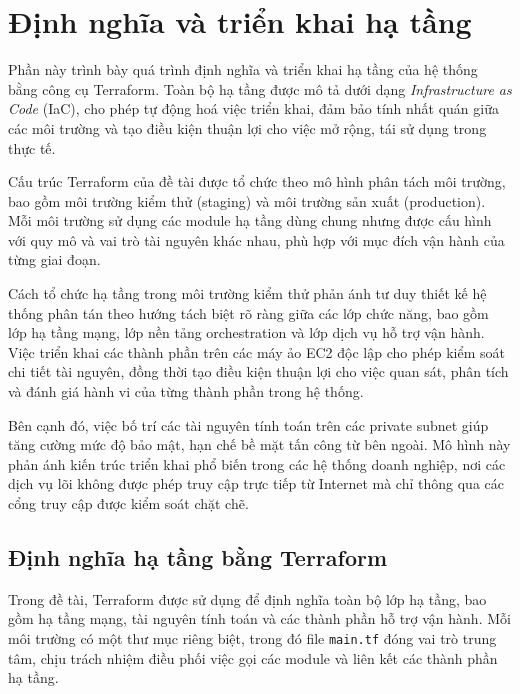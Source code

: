 \clearpage

\section{Định nghĩa và triển khai hạ tầng}
\label{sec:chap2-terraform}

Phần này trình bày quá trình định nghĩa và triển khai hạ tầng của hệ thống bằng công cụ Terraform. 
Toàn bộ hạ tầng được mô tả dưới dạng \textit{Infrastructure as Code} (IaC), cho phép tự động hoá 
việc triển khai, đảm bảo tính nhất quán giữa các môi trường và tạo điều kiện thuận lợi cho việc 
mở rộng, tái sử dụng trong thực tế.

Cấu trúc Terraform của đề tài được tổ chức theo mô hình phân tách môi trường, bao gồm môi trường 
kiểm thử (staging) và môi trường sản xuất (production). Mỗi môi trường sử dụng các module hạ tầng 
dùng chung nhưng được cấu hình với quy mô và vai trò tài nguyên khác nhau, phù hợp với mục đích 
vận hành của từng giai đoạn.

Cách tổ chức hạ tầng trong môi trường kiểm thử phản ánh tư duy thiết kế hệ thống phân tán 
theo hướng tách biệt rõ ràng giữa các lớp chức năng, bao gồm lớp hạ tầng mạng, lớp nền tảng 
orchestration và lớp dịch vụ hỗ trợ vận hành. Việc triển khai các thành phần trên các máy ảo 
EC2 độc lập cho phép kiểm soát chi tiết tài nguyên, đồng thời tạo điều kiện thuận lợi cho việc 
quan sát, phân tích và đánh giá hành vi của từng thành phần trong hệ thống.

Bên cạnh đó, việc bố trí các tài nguyên tính toán trên các private subnet giúp tăng cường mức 
độ bảo mật, hạn chế bề mặt tấn công từ bên ngoài. Mô hình này phản ánh kiến trúc triển khai phổ 
biến trong các hệ thống doanh nghiệp, nơi các dịch vụ lõi không được phép truy cập trực tiếp 
từ Internet mà chỉ thông qua các cổng truy cập được kiểm soát chặt chẽ.

\subsection{Định nghĩa hạ tầng bằng Terraform}
\label{subsec:chap2-terraform-definition}

Trong đề tài, Terraform được sử dụng để định nghĩa toàn bộ lớp hạ tầng, bao gồm hạ tầng mạng, 
tài nguyên tính toán và các thành phần hỗ trợ vận hành. Mỗi môi trường có một thư mục riêng biệt, 
trong đó file \texttt{main.tf} đóng vai trò trung tâm, chịu trách nhiệm điều phối việc gọi các 
module và liên kết các thành phần hạ tầng.

